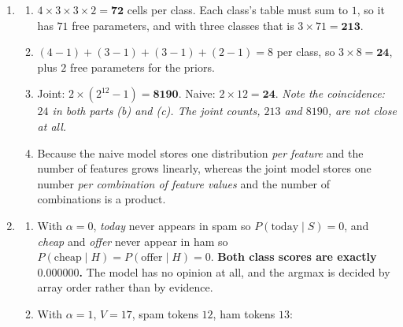 \documentclass[11pt]{article}
\begin{document}
\begin{enumerate}[leftmargin=*, itemsep=0.7em]
\begin{enumerate}[label=(\alph*)]
      Verified: \texttt{CategoricalNB(alpha=1e-10)} returns
      \texttt{No 0.529412 Yes 0.470588} and
      \texttt{CategoricalNB(alpha=1.0)} returns
      \texttt{No 0.468547 Yes 0.531453}.
    \item $\text{Middle}$ never occurs with $\text{No}$, so
      $P(\text{Middle} \mid \text{No}) = 0/4 = 0$ and
      $\text{score}(\text{No}) = \tfrac{4}{10}\cdot 0 \cdot
      \tfrac{2}{4}\cdot\tfrac{2}{4} = 0$ exactly, while
      $\text{score}(\text{Yes}) = \tfrac{6}{10}\cdot\tfrac{2}{6}
      \cdot\tfrac{1}{6}\cdot\tfrac{2}{6} = 0.01111111$. So
      $P(\text{Yes} \mid x) = \mathbf{1.000000}$ --- \textbf{the model
      declares ``No'' impossible on the evidence of four rows}, which is why
      $\alpha > 0$ is the default. With $\alpha = 1$ the same instance gives
      $P(\text{Yes} \mid x) = 0.576471$.
  \end{enumerate}

\item
  \begin{enumerate}[label=(\alph*)]
    \item $4 \times 3 \times 3 \times 2 = \mathbf{72}$ cells per class. Each
      class's table must sum to $1$, so it has $71$ free parameters, and with
      three classes that is $3 \times 71 = \mathbf{213}$.
    \item $(4-1) + (3-1) + (3-1) + (2-1) = 8$ per class, so
      $3 \times 8 = \mathbf{24}$, plus $2$ free parameters for the priors.
    \item Joint: $2 \times (2^{12} - 1) = \mathbf{8190}$. Naive:
      $2 \times 12 = \mathbf{24}$. \emph{Note the coincidence: $24$ in both
      parts (b) and (c). The joint counts, $213$ and $8190$, are not close at
      all.}
    \item Because the naive model stores one distribution \emph{per feature}
      and the number of features grows linearly, whereas the joint model
      stores one number \emph{per combination of feature values} and the
      number of combinations is a product.
  \end{enumerate}

\item
  \begin{enumerate}[label=(\alph*)]
    \item With $\alpha = 0$, \emph{today} never appears in spam so
      $P(\text{today} \mid S) = 0$, and \emph{cheap} and \emph{offer} never
      appear in ham so $P(\text{cheap} \mid H) = P(\text{offer} \mid H) = 0$.
      \textbf{Both class scores are exactly $0.000000$.} The model has no
      opinion at all, and the argmax is decided by array order rather than by
      evidence.
    \item With $\alpha = 1$, $V = 17$, spam tokens $12$, ham tokens $13$:


\end{enumerate}
\end{enumerate}
\end{document}
